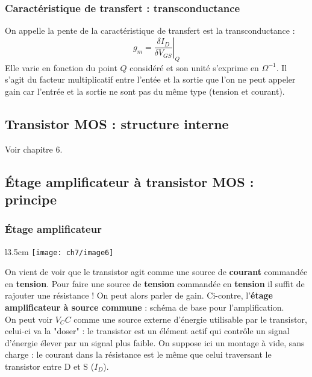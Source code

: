 	\subsubsection{Caractéristique de transfert : transconductance}	
	On appelle la pente de la caractéristique de transfert est la transconductance :
	\begin{equation}
	g_m = \left.\dfrac{\delta I_D}{\delta V_{GS}}\right|_Q
	\end{equation}
	Elle varie en fonction du point $Q$ considéré et son unité s'exprime en 
	$\Omega^{-1}$. Il s'agit du facteur multiplicatif entre l'entée et la sortie que 
	l'on ne peut appeler gain car l'entrée et la sortie ne sont pas du même type (tension 
	et courant).
	
	
	
	\subsection{Transistor MOS : structure interne}	
	Voir chapitre 6.
	
	\subsection{Étage amplificateur à transistor MOS : principe}
		\subsubsection{Étage amplificateur}
			\begin{wrapfigure}[11]{l}{3.5cm}
	\vspace{-0.5cm}
	\texttt{[image: ch7/image6]}
	\end{wrapfigure}
		On vient de voir que le transistor agit comme une source de \textbf{courant} 
		commandée en \textbf{tension}. Pour faire une source de \textbf{tension} 
		commandée en \textbf{tension} il suffit de rajouter une résistance ! On peut 
		alors parler de gain. Ci-contre, l'\textbf{étage amplificateur à source 
		commune} : schéma de base pour l'amplification. \\
		
		On peut voir $V_CC$ comme une source externe d'énergie utilisable par le 
		transistor, celui-ci va la "doser" : le transistor est un élément actif qui 
		contrôle un signal d'énergie élever par un signal plus faible. On suppose 
		ici un montage à vide, sans charge : le courant dans la résistance est le 
		même que celui traversant le transistor entre D et S ($I_D$).
	
